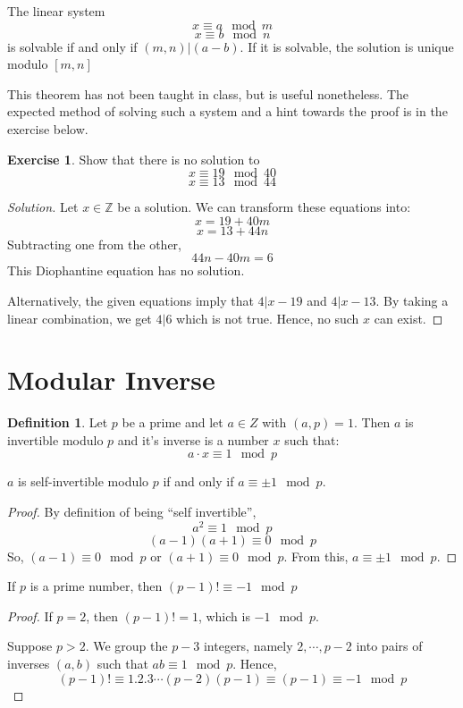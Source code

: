 \documentclass[12pt,letterpaper]{book}
\theoremstyle{definition}
\newtheorem{definition}{Definition} %
\newtheorem*{exercise}{Exercise}
\newenvironment{solution}
  {\renewcommand\qedsymbol{$\blacksquare$}\begin{proof}[Solution]}
  {\end{proof}}
\newcommand{\Z}{\mathbb{Z}}
\begin{document}
\begin{theorem}
  The linear system
  \[x \equiv a \mod m\]
  \[x \equiv b \mod n\]
  is solvable if and only if $(m,n) | (a-b)$. If it is solvable, the solution is unique modulo $[m,n]$
\end{theorem}

This theorem has not been taught in class, but is useful nonetheless. The expected method of solving such a system and a hint towards the proof is in the exercise below.

\begin{exercise}
  Show that there is no solution to
  \[x \equiv 19 \mod 40\]
  \[x \equiv 13 \mod 44\]
\end{exercise}
\begin{solution}
  Let $x \in \Z$ be a solution. We can transform these equations into:
  \[x =19 + 40m \]
  \[x = 13 + 44n \]
  Subtracting one from the other,
  \[44n - 40m = 6\]
  This Diophantine equation has no solution.

  Alternatively, the given equations imply that $4| x - 19$ and $4|x - 13$. By taking a linear combination, we get $4|6$ which is not true. Hence, no such $x$ can exist.
\end{solution}

\section{Modular Inverse}

\begin{definition}
  Let $p$ be a prime and let $a \in Z$ with $(a,p) = 1$. Then $a$ is invertible modulo $p$ and it's inverse is a number $x$ such that:
  \[a \cdot x \equiv 1 \mod p\]
\end{definition}

\begin{lemma}
  $a$ is self-invertible modulo $p$ if and only if $a \equiv \pm 1 \mod p$.
\end{lemma}
\begin{proof}
  By definition of being ``self invertible'',
  \[a^2 \equiv 1 \mod p\]
  \[(a-1)(a+1) \equiv 0 \mod p\]
  So, $(a-1) \equiv 0 \mod p$ or $(a+1) \equiv 0\mod p$. From this, $a \equiv \pm 1 \mod p$.
\end{proof}

\begin{theorem}
  If $p$ is a prime number, then $(p-1)! \equiv -1 \mod p$
\end{theorem}
\begin{proof}
  If $p = 2$, then $(p-1)! = 1$, which is $-1 \mod p$.

  Suppose $p > 2$. We group the $p-3$ integers, namely $2,\cdots,p-2$ into pairs of inverses $(a,b)$ such that $ab \equiv 1 \mod p$. Hence,
  \[(p-1)! \equiv 1.2.3 \cdots (p-2)(p-1) \equiv (p-1) \equiv -1 \mod p\]
\end{proof}
\end{document}

